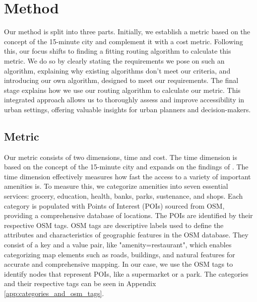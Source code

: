 \clearpage
\section{Method}
\label{sec:method}

Our method is split into three parts.
Initially, we establish a metric based on the concept of the 15-minute city and complement it with a cost metric.
Following this, our focus shifts to finding a fitting routing algorithm to calculate this metric.
We do so by clearly stating the requirements we pose on such an algorithm, explaining why existing algorithms don't meet our criteria, and introducing our own algorithm, designed to meet our requirements. 
The final stage explains how we use our routing algorithm to calculate our metric. 
This integrated approach allows us to thoroughly assess and improve accessibility in urban settings, offering valuable insights for urban planners and decision-makers.

\subsection{Metric}
\label{subsec:metric}

Our metric consists of two dimensions, time and cost.
The time dimension is based on the concept of the 15-minute city and expands on the findings of .
The time dimension effectively measures how fast the access to a variety of important amenities is.
To measure this, we categorize amenities into seven essential services: grocery, education, health, banks, parks, sustenance, and shops.
Each category is populated with Points of Interest (POIs) sourced from OSM, providing a comprehensive database of locations.
The POIs are identified by their respective OSM tags.
OSM tags are descriptive labels used to define the attributes and characteristics of geographic features in the OSM database. 
They consist of a key and a value pair, like "amenity=restaurant", which enables categorizing map elements such as roads, buildings, and natural features for accurate and comprehensive mapping.
In our case, we use the OSM tags to identify nodes that represent POIs, like a supermarket or a park.
The categories and their respective tags can be seen in Appendix \ref{app:categories_and_osm_tags}.


